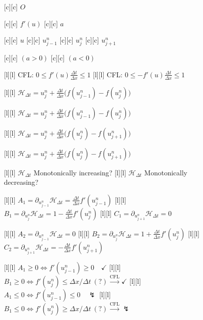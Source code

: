 \begin{figure}[ht]
	\centering
	\footnotesize

	[c] {$O$}

	[c] {$f'(u)$}
	[c] {$a$}

	[c] {$u$}
	[c] {$u^{n}_{j-1}$}
	[c] {$u^{n}_{j}$}
	[c] {$u^{n}_{j+1}$}

	[c] {$(a>0)$}
	[c] {$(a<0)$}

	[l] {CFL: $\displaystyle 0\leq f'(u)\frac{\Delta t}{\Delta x} \leq 1$}
	[l] {CFL: $\displaystyle 0\leq -f'(u)\frac{\Delta t}{\Delta x} \leq 1$}

	[l] {$\displaystyle  \mathcal{H}_{\Delta t}
			= u^{n}_{j} + \frac{\Delta t}{\Delta x}\Big(f(u^{n}_{j-1}) - f(u^{n}_{j})\Big)$}

	[l] {$\displaystyle  \mathcal{H}_{\Delta t}
			= u^{n}_{j} + \frac{\Delta t}{\Delta x}\Big(f(u^{n}_{j-1}) - f(u^{n}_{j})\Big)$}

	[l] {$\displaystyle  \mathcal{H}_{\Delta t}
			= u^{n}_{j} + \frac{\Delta t}{\Delta x}\Big(f(u^{n}_{j}) - f(u^{n}_{j+1})\Big)$}

	[l] {$\displaystyle  \mathcal{H}_{\Delta t}
			= u^{n}_{j} + \frac{\Delta t}{\Delta x}\Big(f(u^{n}_{j}) - f(u^{n}_{j+1})\Big)$}

	[l] {$\mathcal{H}_{\Delta t}$ Monotonically increasing?}
	[l] {$\mathcal{H}_{\Delta t}$ Monotonically decreasing?}

	[l] {$\displaystyle A_{1} = \partial_{u^{n}_{j-1}} \mathcal{H}_{\Delta t}
			= \frac{\Delta t}{\Delta x}f'(u^{n}_{j-1})$}
	[l] {$\displaystyle B_{1} = \partial_{u^{n}_{j}} \mathcal{H}_{\Delta t}
			= 1 - \frac{\Delta t}{\Delta x}f'(u^{n}_{j})$}
	[l] {$\displaystyle C_{1} = \partial_{u^{n}_{j+1}} \mathcal{H}_{\Delta t} = 0$}

	[l] {$\displaystyle A_{2} = \partial_{u^{n}_{j-1}} \mathcal{H}_{\Delta t}
			= 0$}
	[l] {$\displaystyle B_{2} = \partial_{u^{n}_{j}} \mathcal{H}_{\Delta t}
			= 1 + \frac{\Delta t}{\Delta x}f'(u^{n}_{j})$}
	[l] {$\displaystyle C_{2} = \partial_{u^{n}_{j+1}} \mathcal{H}_{\Delta t} =
			-\frac{\Delta t}{\Delta x}f'(u^{n}_{j+1})$}

	[l] {$A_{1}\geq 0 \Leftrightarrow f'(u^{n}_{j-1}) \geq 0\quad \checkmark$}
	[l] {$B_{1}\geq 0 \Leftrightarrow f'(u^{n}_{j}) \leq \Delta x/\Delta t \ (?)\stackrel{\text{CFL}}{\rightarrow}\checkmark$}
	[l] {$A_{1}\leq 0 \Leftrightarrow f'(u^{n}_{j-1}) \leq 0\quad \lightning$}
	[l] {$B_{1}\leq 0 \Leftrightarrow f'(u^{n}_{j}) \geq \Delta x/\Delta t \ (?) \stackrel{\text{CFL}}{\rightarrow}\lightning$}


\end{figure}
